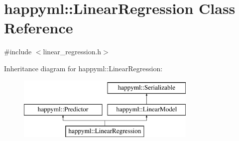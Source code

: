 \hypertarget{classhappyml_1_1LinearRegression}{}\section{happyml\+:\+:Linear\+Regression Class Reference}
\label{classhappyml_1_1LinearRegression}


{\ttfamily \#include $<$linear\+\_\+regression.\+h$>$}

Inheritance diagram for happyml\+:\+:Linear\+Regression\+:\begin{figure}[H]
\begin{center}
\leavevmode
\includegraphics[height=3.000000cm]{classhappyml_1_1LinearRegression}
\end{center}
\end{figure}
